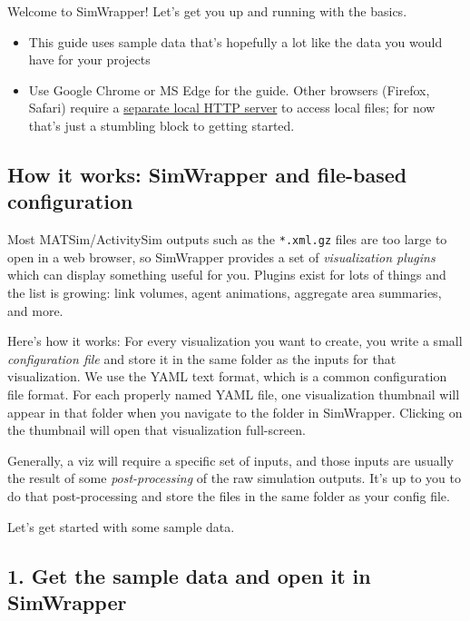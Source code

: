 Welcome to SimWrapper! Let's get you up and running with the basics.

\begin{itemize}
\tightlist
\item
  This guide uses sample data that's hopefully a lot like the data you
  would have for your projects
\item
  Use Google Chrome or MS Edge for the guide. Other browsers (Firefox,
  Safari) require a \href{file-management}{separate local HTTP server}
  to access local files; for now that's just a stumbling block to
  getting started.
\end{itemize}

\hypertarget{how-it-works-simwrapper-and-file-based-configuration}{%
\subsection{How it works: SimWrapper and file-based
configuration}\label{how-it-works-simwrapper-and-file-based-configuration}}

Most MATSim/ActivitySim outputs such as the \texttt{*.xml.gz} files are
too large to open in a web browser, so SimWrapper provides a set of
\emph{visualization plugins} which can display something useful for you.
Plugins exist for lots of things and the list is growing: link volumes,
agent animations, aggregate area summaries, and more.

Here's how it works: For every visualization you want to create, you
write a small \emph{configuration file} and store it in the same folder
as the inputs for that visualization. We use the YAML text format, which
is a common configuration file format. For each properly named YAML
file, one visualization thumbnail will appear in that folder when you
navigate to the folder in SimWrapper. Clicking on the thumbnail will
open that visualization full-screen.

Generally, a viz will require a specific set of inputs, and those inputs
are usually the result of some \emph{post-processing} of the raw
simulation outputs. It's up to you to do that post-processing and store
the files in the same folder as your config file.

Let's get started with some sample data.

\hypertarget{get-the-sample-data-and-open-it-in-simwrapper}{%
\subsection{1. Get the sample data and open it in
SimWrapper}\label{get-the-sample-data-and-open-it-in-simwrapper}}

